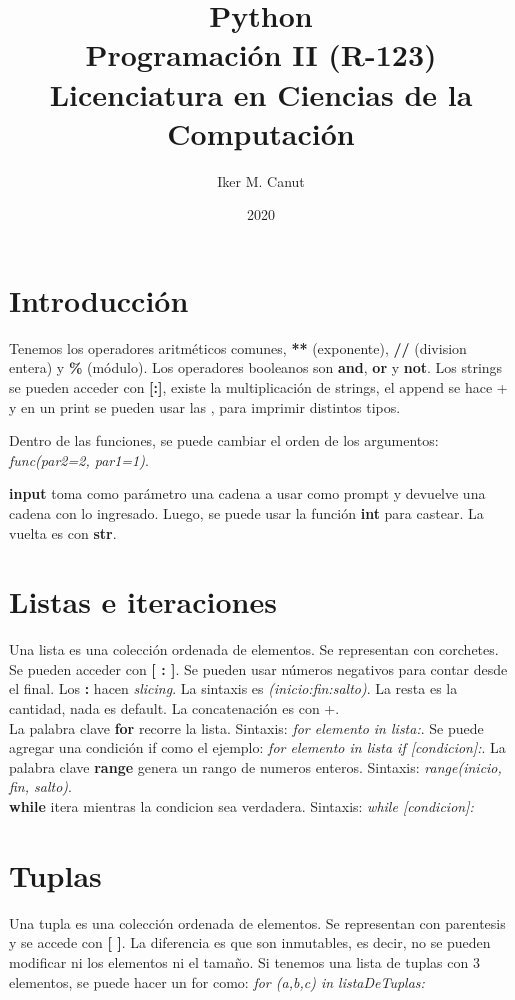 \documentclass[11pt,a4paper]{article}
\author{Iker M. Canut}
\title{Python\\Programaci\'on II (R-123)\\Licenciatura en Ciencias de la Computaci\'on}
\date{2020}
\begin{document}
\maketitle
\newpage
\section{Introducci\'on}
Tenemos los operadores aritm\'eticos comunes, \textbf{**} (exponente), \textbf{//} (division entera) y \textbf{\%} (m\'odulo). Los operadores booleanos son \textbf{and}, \textbf{or} y \textbf{not}. Los strings se pueden acceder con \textbf{[:]}, existe la multiplicaci\'on de strings, el append se hace + y en un print se pueden usar las , para imprimir distintos tipos.

Dentro de las funciones, se puede cambiar el orden de los argumentos: \textit{func(par2=2, par1=1)}.

\textbf{input} toma como parámetro una cadena a usar como prompt y devuelve una cadena con lo ingresado. Luego, se puede usar la funci\'on \textbf{int} para castear. La vuelta es con \textbf{str}.\\

\section{Listas e iteraciones}
Una lista es una colección ordenada de elementos. Se representan con corchetes. Se pueden acceder con \textbf{[ : ]}. Se pueden usar n\'umeros negativos para contar desde el final. Los \textbf{:} hacen \textit{slicing}. La sintaxis es \textit{(inicio:fin:salto)}. La resta es la cantidad, nada es default. La concatenaci\'on es con +.\\

La palabra clave \textbf{for} recorre la lista. Sintaxis: \textit{for elemento in lista:}. Se puede agregar una condici\'on if como el ejemplo: \textit{for elemento in lista if [condicion]:}. La palabra clave \textbf{range} genera un rango de numeros enteros. Sintaxis: \textit{range(inicio, fin, salto)}.\\

\textbf{while} itera mientras la condicion sea verdadera. Sintaxis: \textit{while [condicion]:}

\section{Tuplas}
Una tupla es una colección ordenada de elementos. Se representan con parentesis y se accede con \textbf{[ ]}. La diferencia es que son inmutables, es decir, no se pueden modificar ni los elementos ni el tamaño. Si tenemos una lista de tuplas con 3 elementos, se puede hacer un for como: \textit{for (a,b,c) in listaDeTuplas:}
\end{document}

